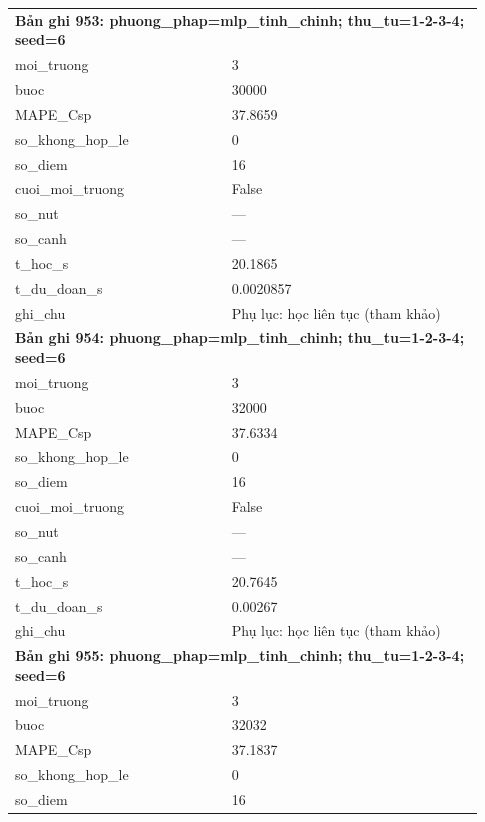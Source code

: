 \begin{longtable}{p{0.43\linewidth}p{0.50\linewidth}}
\midrule
\multicolumn{2}{p{0.95\linewidth}}{\textbf{Bản ghi 953: phuong\_phap=mlp\_tinh\_chinh; thu\_tu=1-2-3-4; seed=6}} \\
moi\_\allowbreak truong & 3 \\
buoc & 30000 \\
MAPE\_\allowbreak Csp & 37.8659 \\
so\_\allowbreak khong\_\allowbreak hop\_\allowbreak le & 0 \\
so\_\allowbreak diem & 16 \\
cuoi\_\allowbreak moi\_\allowbreak truong & False \\
so\_\allowbreak nut & — \\
so\_\allowbreak canh & — \\
t\_\allowbreak hoc\_\allowbreak s & 20.1865 \\
t\_\allowbreak du\_\allowbreak doan\_\allowbreak s & 0.0020857 \\
ghi\_\allowbreak chu & Phụ lục: học liên tục (tham khảo) \\
\midrule
\multicolumn{2}{p{0.95\linewidth}}{\textbf{Bản ghi 954: phuong\_phap=mlp\_tinh\_chinh; thu\_tu=1-2-3-4; seed=6}} \\
moi\_\allowbreak truong & 3 \\
buoc & 32000 \\
MAPE\_\allowbreak Csp & 37.6334 \\
so\_\allowbreak khong\_\allowbreak hop\_\allowbreak le & 0 \\
so\_\allowbreak diem & 16 \\
cuoi\_\allowbreak moi\_\allowbreak truong & False \\
so\_\allowbreak nut & — \\
so\_\allowbreak canh & — \\
t\_\allowbreak hoc\_\allowbreak s & 20.7645 \\
t\_\allowbreak du\_\allowbreak doan\_\allowbreak s & 0.00267 \\
ghi\_\allowbreak chu & Phụ lục: học liên tục (tham khảo) \\
\midrule
\multicolumn{2}{p{0.95\linewidth}}{\textbf{Bản ghi 955: phuong\_phap=mlp\_tinh\_chinh; thu\_tu=1-2-3-4; seed=6}} \\
moi\_\allowbreak truong & 3 \\
buoc & 32032 \\
MAPE\_\allowbreak Csp & 37.1837 \\
so\_\allowbreak khong\_\allowbreak hop\_\allowbreak le & 0 \\
so\_\allowbreak diem & 16 \\

\end{longtable}
